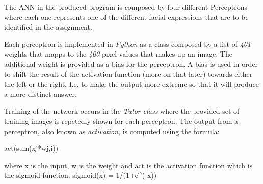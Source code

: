 \documentclass[12pt]{article}
\begin{document}
The ANN in the produced program is composed by four different Perceptrons
where each one represents one of the different facial expressions that are
to be identified in the assignment.

Each perceptron is implemented in \textit{Python} as a class composed by a
list of \textit{401} weights that mapps to the \textit{400} pixel values
that makes up an image. The additional weight is provided as a bias for
the perceptron. A bias is used in order to shift the result of the activation
function (more on that later) towards either the left or the right. I.e.
to make the output more extreme so that it will produce a more distinct
answer.

Training of the network occurs in the \textit{Tutor class} where the provided
set of training images is repetedly shown for each perceptron. The output
from a perceptron, also known as \textit{activation}, is computed using
the formula:

act(sum(xj*wj,i))

where x is the input, w is the weight and act is the activation function
which is the sigmoid function:
sigmoid(x) = 1/(1+e^(-x))

\newpage
%
\end{document}
